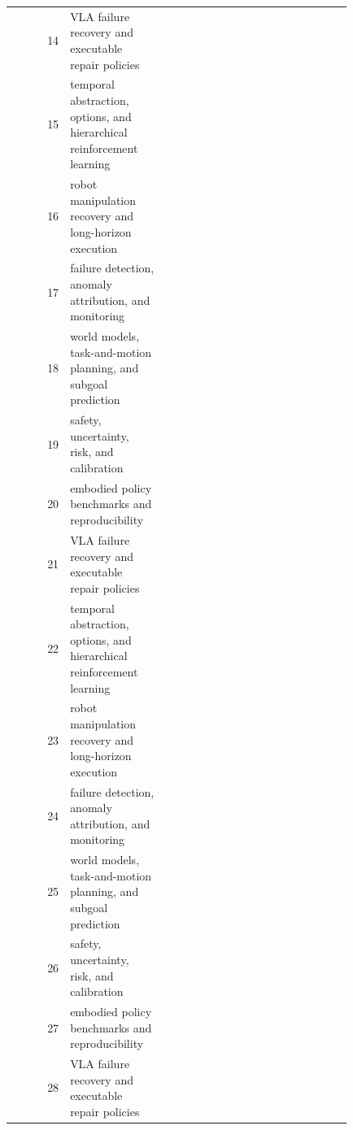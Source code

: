 \documentclass{article}
\begin{document}
\begin{longtable}{@{}r p{0.28\linewidth} p{0.55\linewidth}@{}}
14 & VLA failure recovery and executable repair policies & \citep{naito2024taskpriority34,yang2026a35,zhang2021explainable36} \\
15 & temporal abstraction, options, and hierarchical reinforcement learning & \citep{hangl2016robotic37,kalluraya2024minimumviolation38,ramezani2023safe39} \\
16 & robot manipulation recovery and long-horizon execution & \citep{kwon2025kinodynamic40,kim2026humanoid41,yu2026discovery42} \\
17 & failure detection, anomaly attribution, and monitoring & \citep{meyer2022users43,cheng2021humanaware44,zhang2025modified45} \\
18 & world models, task-and-motion planning, and subgoal prediction & \citep{johannsmeier2017a46,ribasxirgo2026simulatorbased47,pesenti2023imubased48} \\
19 & safety, uncertainty, risk, and calibration & \citep{tang2021a49,tabatabaei2025gazing50,zheng2024statedependent51} \\
20 & embodied policy benchmarks and reproducibility & \citep{wu2025robot52,hayes2016autonomously53,yamashita2025skill54} \\
21 & VLA failure recovery and executable repair policies & \citep{caldas2022tasklevel55,zhao2025manipbench56,du2026perceptive57} \\
22 & temporal abstraction, options, and hierarchical reinforcement learning & \citep{martinbarrio2020design58,liang2021searchbased59,sheidlower2024towards60} \\
23 & robot manipulation recovery and long-horizon execution & \citep{xie2026a61,johannsmeier2016a62,rojas2016robot63} \\
24 & failure detection, anomaly attribution, and monitoring & \citep{zhou2022reactive64,bryan2012automatic65,li2023design66} \\
25 & world models, task-and-motion planning, and subgoal prediction & \citep{cai2022hierarchical67,chand2021multilevel68,liang2021enduser69} \\
26 & safety, uncertainty, risk, and calibration & \citep{deroo2023the70,hansen2024hierarchical71,takayanagi2019hierarchical72} \\
27 & embodied policy benchmarks and reproducibility & \citep{ding2023cluster73,mizannddynamic74,rana2022residual75} \\
28 & VLA failure recovery and executable repair policies & \citep{zhang2021hierarchical76,tian2021redesigning77,qu2023robotic78} \\

\end{longtable}
\end{document}
